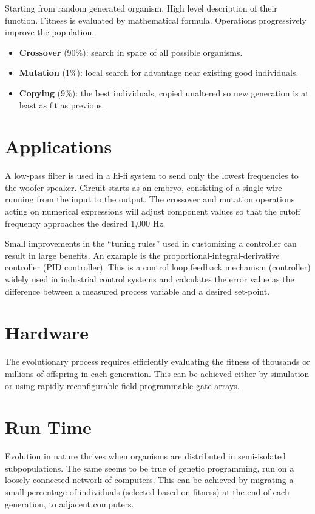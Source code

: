 \documentclass[../main.tex]{subfiles}
\begin{document}
Starting from random generated organism. High level description of their function. Fitness is evaluated by mathematical
formula. Operations progressively improve the population.

\begin{itemize}
	\item \textbf{Crossover} (90\%): search in space of all possible organisms.
	\item \textbf{Mutation} (1\%): local search for advantage near existing good individuals.
	\item \textbf{Copying} (9\%): the best individuals, copied unaltered so new generation is at least as fit as
	previous.
\end{itemize}

\section{Applications}

\begin{ex}
A low-pass filter is used in a hi-fi system to send only the lowest frequencies to the woofer speaker. Circuit starts
as an embryo, consisting of a single wire running from the input to the output. The crossover and mutation operations
acting on numerical expressions will adjust component values so that the cutoff frequency approaches the desired 1,000
Hz.
\end{ex}

\begin{ex}
Small improvements in the ``tuning rules'' used in customizing a controller can result in large benefits. An example is
the proportional-integral-derivative controller (PID controller). This is a control loop feedback mechanism
(controller) widely used in industrial control systems and calculates  the error value as the difference between a
measured process variable and a desired set-point.
\end{ex}

\section{Hardware}
The evolutionary process requires efficiently evaluating the fitness of thousands or millions of offspring in each
generation. This can be achieved either by simulation or using rapidly reconfigurable field-programmable gate arrays.

\section{Run Time}
Evolution in nature thrives when organisms are distributed in semi-isolated subpopulations. The same seems to be true
of genetic programming, run on a loosely connected network of computers. This can be achieved by migrating a small
percentage of individuals (selected based on fitness) at the end of each generation, to adjacent computers.
\end{document}
